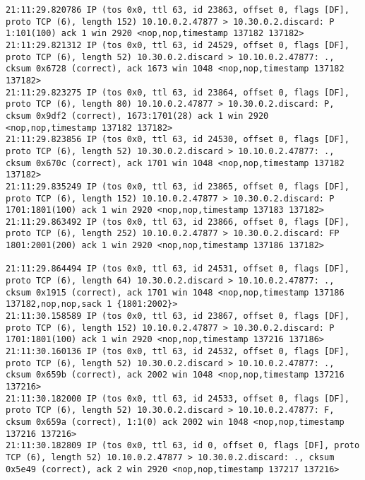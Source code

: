 \documentclass[a4paper,12pt]{article}
\begin{document}
\begin{lstlisting}
21:11:29.820786 IP (tos 0x0, ttl 63, id 23863, offset 0, flags [DF], proto TCP (6), length 152) 10.10.0.2.47877 > 10.30.0.2.discard: P 1:101(100) ack 1 win 2920 <nop,nop,timestamp 137182 137182>
21:11:29.821312 IP (tos 0x0, ttl 63, id 24529, offset 0, flags [DF], proto TCP (6), length 52) 10.30.0.2.discard > 10.10.0.2.47877: ., cksum 0x6728 (correct), ack 1673 win 1048 <nop,nop,timestamp 137182 137182>
21:11:29.823275 IP (tos 0x0, ttl 63, id 23864, offset 0, flags [DF], proto TCP (6), length 80) 10.10.0.2.47877 > 10.30.0.2.discard: P, cksum 0x9df2 (correct), 1673:1701(28) ack 1 win 2920 <nop,nop,timestamp 137182 137182>
21:11:29.823856 IP (tos 0x0, ttl 63, id 24530, offset 0, flags [DF], proto TCP (6), length 52) 10.30.0.2.discard > 10.10.0.2.47877: ., cksum 0x670c (correct), ack 1701 win 1048 <nop,nop,timestamp 137182 137182>
21:11:29.835249 IP (tos 0x0, ttl 63, id 23865, offset 0, flags [DF], proto TCP (6), length 152) 10.10.0.2.47877 > 10.30.0.2.discard: P 1701:1801(100) ack 1 win 2920 <nop,nop,timestamp 137183 137182>
21:11:29.863492 IP (tos 0x0, ttl 63, id 23866, offset 0, flags [DF], proto TCP (6), length 252) 10.10.0.2.47877 > 10.30.0.2.discard: FP 1801:2001(200) ack 1 win 2920 <nop,nop,timestamp 137186 137182>

21:11:29.864494 IP (tos 0x0, ttl 63, id 24531, offset 0, flags [DF], proto TCP (6), length 64) 10.30.0.2.discard > 10.10.0.2.47877: ., cksum 0x1915 (correct), ack 1701 win 1048 <nop,nop,timestamp 137186 137182,nop,nop,sack 1 {1801:2002}>
21:11:30.158589 IP (tos 0x0, ttl 63, id 23867, offset 0, flags [DF], proto TCP (6), length 152) 10.10.0.2.47877 > 10.30.0.2.discard: P 1701:1801(100) ack 1 win 2920 <nop,nop,timestamp 137216 137186>
21:11:30.160136 IP (tos 0x0, ttl 63, id 24532, offset 0, flags [DF], proto TCP (6), length 52) 10.30.0.2.discard > 10.10.0.2.47877: ., cksum 0x659b (correct), ack 2002 win 1048 <nop,nop,timestamp 137216 137216>
21:11:30.182000 IP (tos 0x0, ttl 63, id 24533, offset 0, flags [DF], proto TCP (6), length 52) 10.30.0.2.discard > 10.10.0.2.47877: F, cksum 0x659a (correct), 1:1(0) ack 2002 win 1048 <nop,nop,timestamp 137216 137216>
21:11:30.182809 IP (tos 0x0, ttl 63, id 0, offset 0, flags [DF], proto TCP (6), length 52) 10.10.0.2.47877 > 10.30.0.2.discard: ., cksum 0x5e49 (correct), ack 2 win 2920 <nop,nop,timestamp 137217 137216>


\end{lstlisting}
\end{document}
